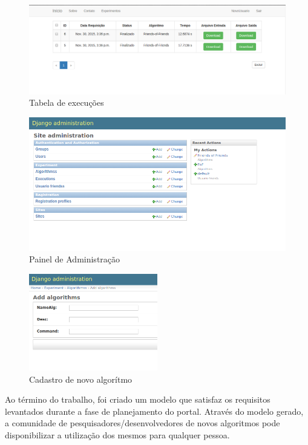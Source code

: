\documentclass[tg]{mdtufsm}
\begin{document}
\begin{figure}
	\centering
	\includegraphics[width=1\textwidth]{asd}
	\caption{
		Tabela de execuções
	}
	\label{fig:asd}
\end{figure}
\begin{figure}
	\centering
	\includegraphics[width=1\textwidth]{res4}
	\caption{
		Painel de Administração
	}
	\label{fig:res4}
\end{figure}
\begin{figure}
	\centering
	\includegraphics[width=0.5\textwidth]{res5}
	\caption{
		Cadastro de novo algorítmo
	}
	\label{fig:res5}
\end{figure}

Ao término do trabalho, foi criado um modelo que satisfaz os requisitos levantados durante a fase de planejamento do portal. Através do modelo gerado, a comunidade de pesquisadores/desenvolvedores de novos algoritmos pode disponibilizar a utilização dos mesmos para qualquer pessoa.
\end{document}
